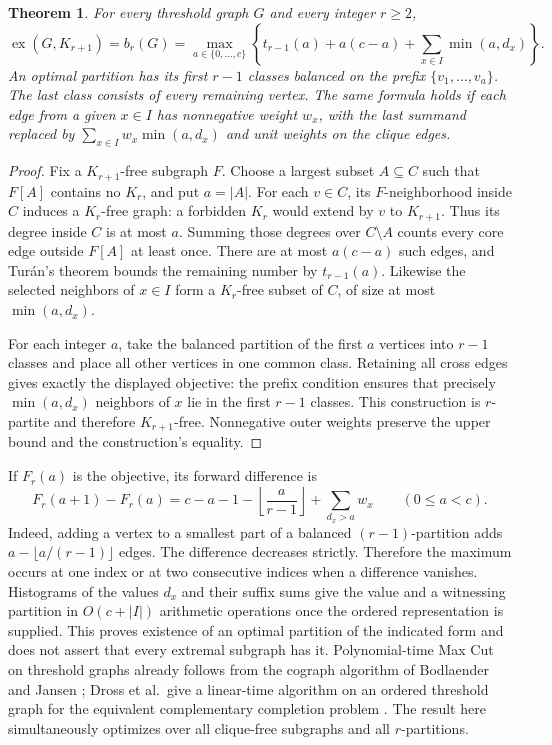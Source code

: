 \documentclass[11pt,a4paper]{article}
\newtheorem{theorem}{Theorem}[section]
\begin{document}
\begin{theorem}\label{thm:threshold-turan}
For every threshold graph $G$ and every integer $r\ge2$,
\[
 \operatorname{ex}(G,K_{r+1})=b_r(G)
 =\max_{a\in\{0,\ldots,c\}}
 \left\{t_{r-1}(a)+a(c-a)+\sum_{x\in I}\min(a,d_x)\right\}.
\]
An optimal partition has its first $r-1$ classes balanced on the prefix $\{v_1,\ldots,v_a\}$. The last class consists of every remaining vertex. The same formula holds if each edge from a given $x\in I$ has nonnegative weight $w_x$, with the last summand replaced by $\sum_{x\in I}w_x\min(a,d_x)$ and unit weights on the clique edges.
\end{theorem}
\begin{proof}
Fix a $K_{r+1}$-free subgraph $F$. Choose a largest subset $A\subseteq C$ such that $F[A]$ contains no $K_r$, and put $a=|A|$. For each $v\in C$, its $F$-neighborhood inside $C$ induces a $K_r$-free graph: a forbidden $K_r$ would extend by $v$ to $K_{r+1}$. Thus its degree inside $C$ is at most $a$. Summing those degrees over $C\setminus A$ counts every core edge outside $F[A]$ at least once. There are at most $a(c-a)$ such edges, and Turán's theorem bounds the remaining number by $t_{r-1}(a)$. Likewise the selected neighbors of $x\in I$ form a $K_r$-free subset of $C$, of size at most $\min(a,d_x)$.

For each integer $a$, take the balanced partition of the first $a$ vertices into $r-1$ classes and place all other vertices in one common class. Retaining all cross edges gives exactly the displayed objective: the prefix condition ensures that precisely $\min(a,d_x)$ neighbors of $x$ lie in the first $r-1$ classes. This construction is $r$-partite and therefore $K_{r+1}$-free. Nonnegative outer weights preserve the upper bound and the construction's equality.
\end{proof}

If $F_r(a)$ is the objective, its forward difference is
\[
 F_r(a+1)-F_r(a)
  =c-a-1-\left\lfloor\frac a{r-1}\right\rfloor+\sum_{d_x>a}w_x
 \qquad(0\le a<c).
\]
Indeed, adding a vertex to a smallest part of a balanced $(r-1)$-partition adds $a-\lfloor a/(r-1)\rfloor$ edges. The difference decreases strictly. Therefore the maximum occurs at one index or at two consecutive indices when a difference vanishes. Histograms of the values $d_x$ and their suffix sums give the value and a witnessing partition in $O(c+|I|)$ arithmetic operations once the ordered representation is supplied. This proves existence of an optimal partition of the indicated form and does not assert that every extremal subgraph has it. Polynomial-time Max Cut on threshold graphs already follows from the cograph algorithm of Bodlaender and Jansen \cite{bjcut}; Dross et al.\ give a linear-time algorithm on an ordered threshold graph for the equivalent complementary completion problem \cite[Theorem~4.6]{drosscompletion}. The result here simultaneously optimizes over all clique-free subgraphs and all $r$-partitions.
\end{document}
